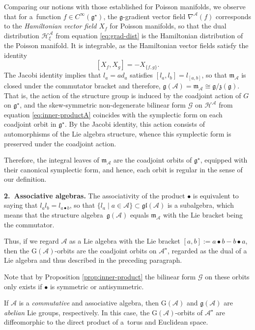 \documentclass[10pt,a4paper]{amsart}
\numberwithin{equation}{section}
\newcommand{\hh}{\mathcal{H}}
\newcommand{\m}{\mathfrak{m}}
\newcommand{\G}{\mathrm{G}}
\newcommand{\g}{{\mathfrak{g}}}
\renewcommand{\m}{{\mathfrak m}}
\newcommand{\gl}{{\mathfrak{gl}}}
\newcommand{\cA}{\mathcal{A}}
\newcommand{\Gcal}{\mathcal{G}}
\begin{document}
Comparing our notions with those established for Poisson manifolds, we observe that for a~function $f \in C^\infty(\g^\star)$, the $\g$-gradient vector field $\nabla^{\cA}(f)$ corresponds to the {\em Hamiltonian vector field $X_f$} for Poisson manifolds, so that the dual distribution $\hh^\cA_\xi$ from equation \eqref{eq:grad-dist} is the Hamiltonian distribution of the Poisson manifold.
It is integrable, as the Hamiltonian vector fields satisfy the identity
\[
[X_f, X_g] = -X_{\{f,g\}}.
\]
The Jacobi identity implies that $l_a = ad_a$ satisfies $[l_a, l_b] = l_{[a,b]}$, so that $\m_\cA$ is closed under the commutator bracket and therefore, $\g(\cA) = \m_\cA \cong \g/\mathfrak{z}(\g)$.
That is, the action of the structure group is induced by the coadjoint action of $G$ on $\g^\star$, and the skew-symmetric non-degenerate bilinear form $\Gcal$ on $\hh^\cA$ from equation \eqref{eq:inner-productA} coincides with the symplectic form on each coadjoint orbit in $\g^\star$.
By the Jacobi identity, this action consists of automorphisms of the Lie algebra structure, whence this symplectic form is preserved under the coadjoint action.

Therefore, the integral leaves of $\m_\cA$ are the coadjoint orbits of $\g^\star$, equipped with their canonical symplectic form, and hence, each orbit is regular in the sense of our definition.

{\bf 2.\ Associative algebras.} The associativity of the product $\bullet$ is equivalent to saying that $l_a l_b  = l_{a\bullet b}$, so that $\{l_a \mid a \in \cA\} \subset \gl(\cA)$ is a subalgebra, which means that the structure algebra~$\g(\cA)$ equals $\m_\cA$ with the Lie bracket being the commutator.

Thus, if we regard $\cA$ as a Lie algebra with the Lie bracket $[a,b] := a \bullet b - b \bullet a$, then the $\G(\cA)$-orbits are the coadjoint orbits on $\cA^\star$, regarded as the dual of a Lie algebra and thus described in the preceding paragraph.

Note that by Proposition \ref{prop:inner-product} the bilinear form $\Gcal$ on these orbits only exists if $\bullet$ is symmetric or antisymmetric.

If $\cA$ is a {\em commutative} and associative algebra, then $\G(\cA)$ and $\g(\cA)$ are {\em abelian} Lie groups, respectively.
In this case, the $\G(\cA)$-orbits of $\cA^\star$ are diffeomorphic to the direct product of a~torus and Euclidean space.
\end{document}
